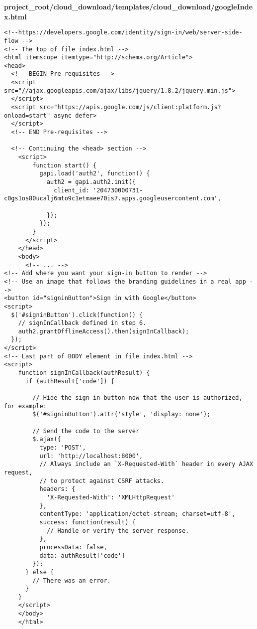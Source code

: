 \documentclass{article}
\begin{document}
\newpage
\textbf{project\_root/cloud\_download/templates/cloud\_download/googleIndex.html}
\begin{verbatim}
<!--https://developers.google.com/identity/sign-in/web/server-side-flow -->
<!-- The top of file index.html -->
<html itemscope itemtype="http://schema.org/Article">
<head>
  <!-- BEGIN Pre-requisites -->
  <script src="//ajax.googleapis.com/ajax/libs/jquery/1.8.2/jquery.min.js">
  </script>
  <script src="https://apis.google.com/js/client:platform.js?onload=start" async defer>
  </script>
  <!-- END Pre-requisites -->

  <!-- Continuing the <head> section -->
    <script>
        function start() {
          gapi.load('auth2', function() {
            auth2 = gapi.auth2.init({
              client_id: '204730000731-c0gs1os80ucalj6mto9c1etmaee70is7.apps.googleusercontent.com',
        
            });
          });
        }
      </script>
    </head>
    <body>
      <!-- ... -->
<!-- Add where you want your sign-in button to render -->
<!-- Use an image that follows the branding guidelines in a real app -->
<button id="signinButton">Sign in with Google</button>
<script>
  $('#signinButton').click(function() {
    // signInCallback defined in step 6.
    auth2.grantOfflineAccess().then(signInCallback);
  });
</script>
<!-- Last part of BODY element in file index.html -->
<script>
    function signInCallback(authResult) {
      if (authResult['code']) {
    
        // Hide the sign-in button now that the user is authorized, for example:
        $('#signinButton').attr('style', 'display: none');
    
        // Send the code to the server
        $.ajax({
          type: 'POST',
          url: 'http://localhost:8000',
          // Always include an `X-Requested-With` header in every AJAX request,
          // to protect against CSRF attacks.
          headers: {
            'X-Requested-With': 'XMLHttpRequest'
          },
          contentType: 'application/octet-stream; charset=utf-8',
          success: function(result) {
            // Handle or verify the server response.
          },
          processData: false,
          data: authResult['code']
        });
      } else {
        // There was an error.
      }
    }
    </script>
    </body>
    </html>
\end{verbatim}
\end{document}
